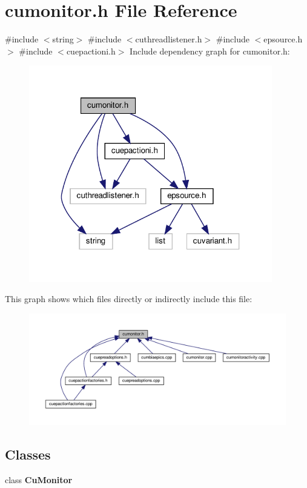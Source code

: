 \section{cumonitor.\+h File Reference}
\label{cumonitor_8h}
{\ttfamily \#include $<$string$>$}\newline
{\ttfamily \#include $<$cuthreadlistener.\+h$>$}\newline
{\ttfamily \#include $<$epsource.\+h$>$}\newline
{\ttfamily \#include $<$cuepactioni.\+h$>$}\newline
Include dependency graph for cumonitor.\+h\+:\nopagebreak
\begin{figure}[H]
\begin{center}
\leavevmode
\includegraphics[width=301pt]{cumonitor_8h__incl}
\end{center}
\end{figure}
This graph shows which files directly or indirectly include this file\+:\nopagebreak
\begin{figure}[H]
\begin{center}
\leavevmode
\includegraphics[width=350pt]{cumonitor_8h__dep__incl}
\end{center}
\end{figure}
\subsection*{Classes}
\begin{DoxyCompactItemize}
\item 
class \textbf{ Cu\+Monitor}
\end{DoxyCompactItemize}
